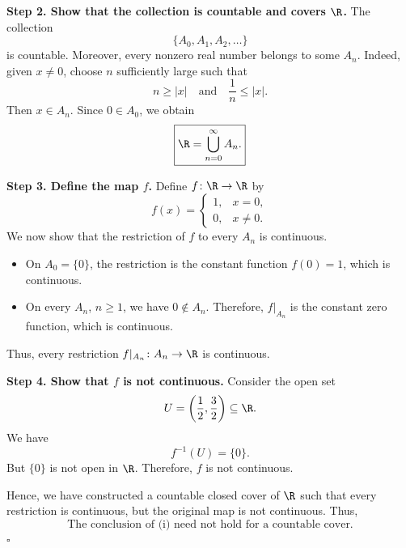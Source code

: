 \textbf{Step 2. Show that the collection is countable and covers $\R$.}
The collection
\[ \{A_0,A_1,A_2,\dots\} \]
is countable. Moreover, every nonzero real number belongs to some $A_n$. Indeed, given
$x\neq0$, choose $n$ sufficiently large such that
\[ n\ge|x|\quad\text{and}\quad\frac1n\le|x|. \]
Then $x\in A_n$. Since $0\in A_0$, we obtain
\[ \boxed{\R=\bigcup_{n=0}^\infty A_n.} \]

\textbf{Step 3. Define the map $f$.}
Define $f\colon\R\to\R$ by
\[ f(x)=\begin{cases} 1, & x=0,\\ 0, & x\neq0.\end{cases} \]
We now show that the restriction of $f$ to every $A_n$ is continuous.
\begin{itemize}
  \item On $A_0=\{0\}$, the restriction is the constant function $f(0)=1$, which is continuous.
  \item On every $A_n$, $n\ge1$, we have $0\notin A_n$. Therefore, $f|_{A_n}$ is the constant
        zero function, which is continuous.
\end{itemize}
Thus, every restriction $f|_{A_n}\colon A_n\to\R$ is continuous.

\textbf{Step 4. Show that $f$ is not continuous.}
Consider the open set
\[ U=\left(\frac12,\frac32\right)\subseteq\R. \]
We have
\[ f^{-1}(U)=\{0\}. \]
But $\{0\}$ is not open in $\R$. Therefore, $f$ is not continuous.

Hence, we have constructed a countable closed cover of $\R$ such that every restriction is
continuous, but the original map is not continuous. Thus,
\[ \boxed{\text{The conclusion of (i) need not hold for a countable cover.}} \]
\hfill$\square$

